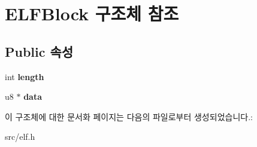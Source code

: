\hypertarget{struct_e_l_f_block}{}\section{E\+L\+F\+Block 구조체 참조}
\label{struct_e_l_f_block}
\subsection*{Public 속성}
\begin{DoxyCompactItemize}
\item 
\mbox{\label{struct_e_l_f_block_ae79f929b79d2f694695b0633a55078de}} 
int {\bfseries length}
\item 
\mbox{\label{struct_e_l_f_block_a04ec3cb9c21f5e2b3f720733cb892d21}} 
u8 $\ast$ {\bfseries data}
\end{DoxyCompactItemize}


이 구조체에 대한 문서화 페이지는 다음의 파일로부터 생성되었습니다.\+:\begin{DoxyCompactItemize}
\item 
src/elf.\+h\end{DoxyCompactItemize}
